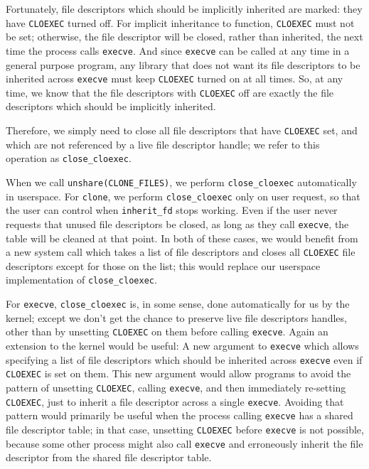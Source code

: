 \documentclass[letterpaper,twocolumn,10pt]{article}
\begin{document}
Fortunately, file descriptors which should be implicitly inherited are marked:
they have \texttt{CLOEXEC} turned off.
For implicit inheritance to function, \texttt{CLOEXEC} must not be set;
otherwise, the file descriptor will be closed, rather than inherited,
the next time the process calls \texttt{execve}.
And since \texttt{execve} can be called at any time in a general purpose program,
any library that does not want its file descriptors to be inherited across \texttt{execve}
must keep \texttt{CLOEXEC} turned on at all times.
So, at any time, we know that the file descriptors with \texttt{CLOEXEC} off
are exactly the file descriptors which should be implicitly inherited.

Therefore, we simply need to close all file descriptors that have \texttt{CLOEXEC} set,
and which are not referenced by a live file descriptor handle;
we refer to this operation as \verb|close_cloexec|.

When we call \texttt{unshare(CLONE\_FILES)},
we perform \texttt{close\_cloexec} automatically in userspace.
For \texttt{clone}, we perform \verb|close_cloexec| only on user request,
so that the user can control when \verb|inherit_fd| stops working.
Even if the user never requests that unused file descriptors be closed,
as long as they call \texttt{execve}, the table will be cleaned at that point.
In both of these cases,
we would benefit from a new system call which takes a list of file descriptors
and closes all \texttt{CLOEXEC} file descriptors except for those on the list;
this would replace our userspace implementation of \verb|close_cloexec|.

For \texttt{execve}, \verb|close_cloexec| is, in some sense, done automatically for us by the kernel;
except we don't get the chance to preserve live file descriptors handles,
other than by unsetting \texttt{CLOEXEC} on them before calling \texttt{execve}.
Again an extension to the kernel would be useful:
A new argument to \texttt{execve} which allows specifying a list of file descriptors
which should be inherited across \texttt{execve} even if \texttt{CLOEXEC} is set on them.
This new argument would allow programs to avoid the pattern
of unsetting \texttt{CLOEXEC}, calling \texttt{execve}, and then immediately re-setting \texttt{CLOEXEC},
just to inherit a file descriptor across a single \texttt{execve}.
Avoiding that pattern would primarily be useful
when the process calling \texttt{execve} has a shared file descriptor table;
in that case, unsetting \texttt{CLOEXEC} before \texttt{execve} is not possible,
because some other process might also call \texttt{execve}
and erroneously inherit the file descriptor from the shared file descriptor table.
\end{document}
